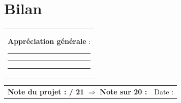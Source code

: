 \documentclass[10pt,a4paper]{article}
\begin{document}
\section*{Bilan}
\begin{tabularx}{\linewidth}{@{}X@{}}
\textbf{Appréciation générale} :\par\medskip
\hrule\medskip\hrule\medskip\hrule\medskip
\end{tabularx}

\bigskip
\begin{tabularx}{\linewidth}{@{}X r@{}}
\textbf{Note du projet : \hspace{1.5cm} / 21} \quad $\Rightarrow$ \quad \textbf{Note sur 20 : \hspace{1.5cm}} & Date : \dotfill \\
\end{tabularx}
\end{document}
